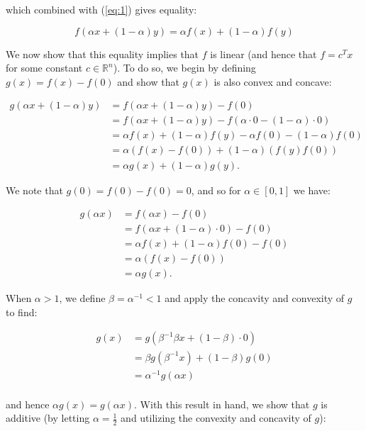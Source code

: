 \begin{solution}
  which combined with (\ref{eq:1}) gives equality:
  
  $$
    f(\alpha x + (1 - \alpha)y) = \alpha f(x) + (1 - \alpha) f(y)
  $$

  We now show that this equality implies that $f$ is linear (and hence that $f = c^T x$ for some
  constant $c \in \mathbb{R}^n$). To do so, we begin by defining $g(x) = f(x) - f(0)$ and show that
  $g(x)$ is also convex and concave:

  \begin{align*}
    g(\alpha x + (1 - \alpha) y) &= f(\alpha x + (1 - \alpha) y) - f(0) \\
                                 &= f(\alpha x + (1 - \alpha) y) - f(\alpha \cdot 0 - (1 - \alpha) \cdot 0) \\
                                 &= \alpha f(x) + (1 - \alpha) f(y) - \alpha f(0) - (1 - \alpha) f(0) \\
                                 &= \alpha \left(f(x) - f(0) \right) + (1 - \alpha) \left(f(y) f(0) \right) \\
                                 &= \alpha g(x) + (1 - \alpha) g(y).
  \end{align*}

  We note that $g(0) = f(0) - f(0) = 0$, and so for $\alpha \in [0, 1]$ we have:

  \begin{align*}
    g(\alpha x) &= f(\alpha x) - f(0) \\
                &= f(\alpha x + (1 - \alpha) \cdot 0) - f(0) \\
                &= \alpha f(x) + (1 - \alpha) f(0) - f(0) \\
                &= \alpha \left(f(x) - f(0)\right) \\
                &= \alpha g(x).
  \end{align*}

  When $\alpha > 1$, we define $\beta = \alpha^{-1} < 1$ and apply the concavity and convexity of $g$
  to find:

  \begin{align*}
    g(x) &= g(\beta^{-1} \beta x + (1 - \beta) \cdot 0) \\
         &= \beta g(\beta^{-1} x) + (1 - \beta) g(0) \\
         &= \alpha^{-1} g(\alpha x) \\
  \end{align*}

  and hence $\alpha g(x) = g(\alpha x)$. With this result in hand, we show that $g$ is additive (by letting 
  $\alpha = \frac{1}{2}$ and utilizing the convexity and concavity of $g$):


\end{solution}
